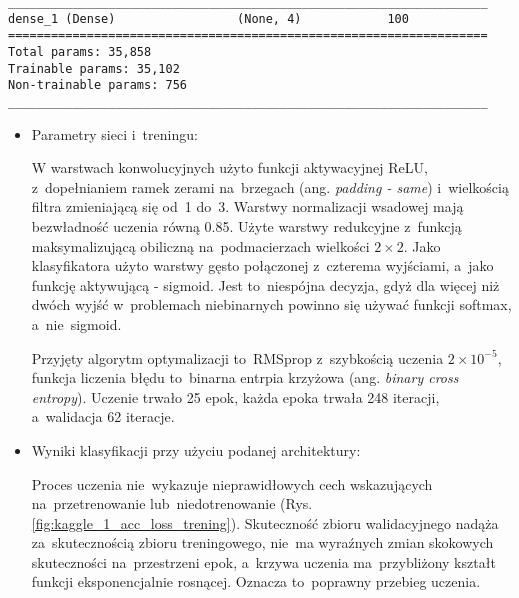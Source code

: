 {\newsavebox\myvvvvv
\begin{lrbox}{\myvvvvv}
\setlength{\myminipagewidth}{0.9\linewidth} %
\setlength{\myminipagecentering}{(\linewidth-\myminipagewidth)/2}
\noindent\hspace{\myminipagecentering}\begin{minipage}{\myminipagewidth}
\begin{verbatim}
___________________________________________________________________
dense_1 (Dense)                 (None, 4)            100    
===================================================================
Total params: 35,858
Trainable params: 35,102
Non-trainable params: 756
___________________________________________________________________
\end{verbatim} 
\end{minipage}\end{lrbox}
\resizebox{0.75\textwidth}{!}{\usebox\myvvvvv}

\begin{itemize}
\item Parametry sieci i~treningu:

W warstwach konwolucyjnych użyto funkcji aktywacyjnej ReLU, z~dopełnianiem ramek zerami na~brzegach (ang. \textit{padding - same}) i~wielkością filtra zmieniającą się od~1 do~3. Warstwy normalizacji wsadowej mają bezwładność uczenia równą 0.85. Użyte warstwy redukcyjne z~funkcją maksymalizującą obiliczną na~podmacierzach wielkości $2\times2$. Jako klasyfikatora użyto warstwy gęsto połączonej z~czterema wyjściami, a~jako funkcję aktywującą - sigmoid. Jest to~niespójna decyzja, gdyż dla więcej niż dwóch wyjść w~problemach niebinarnych powinno się używać funkcji softmax, a~nie~sigmoid.

Przyjęty algorytm optymalizacji to~RMSprop z~szybkością uczenia \(2 \times 10^{-5}\), funkcja liczenia błędu to~binarna entrpia krzyżowa (ang. \textit{binary cross entropy}). Uczenie trwało 25 epok, każda epoka trwała 248 iteracji, a~walidacja 62 iteracje.

\item Wyniki klasyfikacji przy użyciu podanej architektury:

Proces uczenia nie~wykazuje nieprawidłowych cech wskazujących na~przetrenowanie lub~niedotrenowanie (Rys. \ref{fig:kaggle_1_acc_loss_trening}). Skuteczność zbioru walidacyjnego nadąża za~skutecznością zbioru treningowego, nie~ma wyraźnych zmian skokowych skuteczności na~przestrzeni epok, a~krzywa uczenia ma~przybliżony kształt funkcji eksponencjalnie rosnącej. Oznacza to~poprawny przebieg uczenia.


\end{itemize}}
